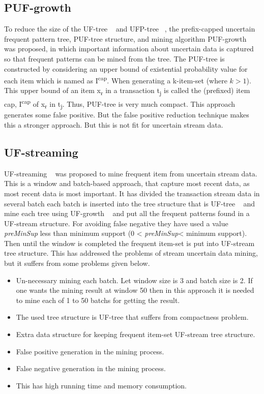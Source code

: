     \subsection{PUF-growth}
    To reduce the size of the UF-tree ~\cite{uf_growth} and UFP-tree ~\cite{ufp_growth}, the preﬁx-capped uncertain frequent pattern tree, PUF-tree structure, and mining algorithm PUF-growth ~\cite{puf_growth} was proposed, in which important information about uncertain data is captured so that frequent patterns can be mined from the tree. The PUF-tree  is constructed by considering an upper bound of existential probability value for each item  which is named as I\textsuperscript{cap}. When generating a k-item-set (where $k>1$). This upper bound of an item x\textsubscript{r} in a transaction t\textsubscript{j} is called the (preﬁxed) item cap, I\textsuperscript{cap} of x\textsubscript{r} in t\textsubscript{j}. Thus, PUF-tree is very much compact. This approach generates some false positive. But the false positive reduction technique makes this a stronger approach. But this is not fit for uncertain stream data. 
    
    \subsection{UF-streaming}
    UF-streaming ~\cite{suf_growth} was proposed to mine frequent item from uncertain stream data. This is a window and batch-based approach, that capture most recent data, as most recent data is most important. It has divided the transaction stream data in several batch each batch is inserted into the tree structure that is UF-tree ~\cite{uf_growth} and mine each tree using UF-growth ~\cite{uf_growth} and put all the frequent patterns found in a UF-stream structure. For avoiding false negative they have used a value \emph{preMinSup} less than minimum support (0 < \emph{preMinSup}< minimum support). Then until the window is completed the frequent item-set is put into UF-stream tree structure. This has addressed the problems of stream uncertain data mining, but it suffers from some problems given below.
    \begin{itemize}
        \item Un-necessary mining each batch. Let window size is 3 and batch size is 2. If one wants the mining result at window 50 then in this approach it is needed to mine each of 1 to 50 batchs for getting the result.
        \item The used tree structure is UF-tree that suffers from compactness problem.
        \item Extra data structure for keeping frequent item-set UF-stream tree structure.
        \item False positive generation in the mining process.
        \item False negative generation in the mining process.
        \item This has high running time and memory consumption.
    \end{itemize}
    
